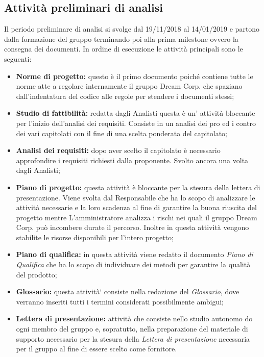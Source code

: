 \subsection{Attività preliminari di analisi}
Il periodo preliminare di analisi si svolge dal 19/11/2018 al 14/01/2019 e partono dalla formazione del gruppo terminando poi alla prima milestone ovvero la consegna dei documenti. \newline
In ordine di esecuzione le attività principali sono le seguenti:
\begin{itemize}
	\item{\textbf{Norme di progetto:} questo è il primo documento poiché contiene tutte le norme atte a regolare internamente il gruppo Dream Corp. che spaziano dall'indentatura del codice alle regole per stendere i documenti stessi;}
	\item{\textbf{Studio di fattibilità:} redatta dagli Analisti questa è un' attività bloccante per l'inizio dell'analisi dei requisiti. Consiste in un analisi dei pro ed i contro dei vari capitolati con il fine di una scelta ponderata del capitolato;}
	\item{\textbf{Analisi dei requisiti:} dopo aver scelto il capitolato è necessario approfondire i requisiti richiesti dalla proponente. Svolto ancora una volta dagli Analisti;}
	\item{\textbf{Piano di progetto:} questa attività è bloccante per la stesura della lettera di presentazione. Viene svolta dal Responsabile che ha lo scopo di analizzare le attività necessarie e la loro scadenza al fine di garantire la  buona riuscita del progetto mentre L'amministratore analizza i rischi nei quali il gruppo Dream Corp. può incombere durate il percorso. Inoltre in questa attività vengono stabilite le risorse disponibili per l'intero progetto;}
	\item{\textbf{Piano di qualifica:} in questa attività viene redatto il documento \textit{Piano di Qualifica} che ha lo scopo di individuare dei metodi per garantire la qualità del prodotto;}
	\item{\textbf{Glossario:} questa attività` consiste nella redazione del \textit{Glossario}, dove verranno inseriti tutti i termini considerati possibilmente ambigui;} 
	\item{\textbf{Lettera di presentazione:} attività che consiste nello studio autonomo do ogni membro del gruppo e, sopratutto, nella preparazione del materiale di supporto necessario per la stesura della \textit{Lettera di presentazione} necessaria per il gruppo al fine di essere scelto come fornitore.}
\end{itemize}

